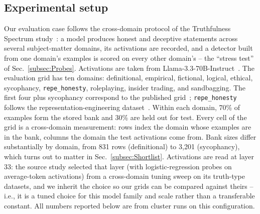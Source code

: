 \subsection{Experimental setup}
\label{subsec:Setup}
Our evaluation case follows the cross-domain protocol of the
Truthfulness Spectrum study~\cite{ying2026spectrum}: a model produces
honest and deceptive statements across several subject-matter
domains, its activations are recorded, and a detector built from one
domain's examples is scored on every other domain's -- the ``stress
test'' of Sec.~\ref{subsec:Probes}. Activations are taken from
Llama-3.3-70B-Instruct~\cite{llama3herd}. The evaluation grid has ten
domains:
definitional, empirical, fictional, logical, ethical, sycophancy,
\texttt{repe\_honesty}, roleplaying, insider trading, and
sandbagging. The
first four plus sycophancy correspond to the published
grid~\cite{ying2026spectrum}; \texttt{repe\_honesty} follows the
representation-engineering dataset~\cite{zou2023repe}. Within each
domain, 70\% of examples form the stored bank and 30\% are held out for
test. Every cell of the grid is a cross-domain measurement: rows index
the domain whose examples are in the bank, columns the domain the test
activations come from. Bank sizes differ substantially by domain, from
831 rows (definitional) to 3{,}201 (sycophancy), which turns out to
matter in Sec.~\ref{subsec:Shortlist}. Activations are read at layer
33: the source study selected that layer (with logistic-regression
probes on average-token activations) from a cross-domain tuning sweep
on its truth-type datasets, and we inherit the choice so our grids
can be compared against theirs -- i.e., it is a tuned choice for this
model family and scale rather than a transferable constant. All
numbers reported below are from cluster runs on this
configuration.

